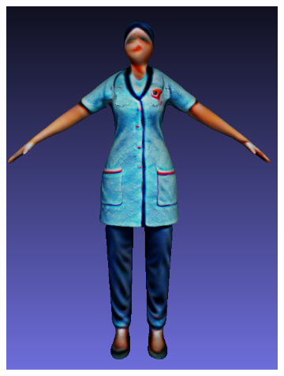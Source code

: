 \begin{figure}[H]
\begin{subfigure}[b]{0.232\textwidth}
        \includegraphics[width=\textwidth]{figures/future/bias_nurse_genie_4.png}
        \caption{}
    \end{subfigure}


\end{figure}
